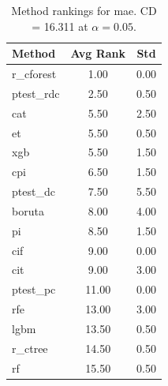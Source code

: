 \begin{table}[h]
\centering
\caption{Method rankings for mae. CD = 16.311 at $\alpha=0.05$.}
\label{tab:ranks_mae}
\begin{tabular}{lcc}
\toprule
Method & Avg Rank & Std \\
\midrule
r_cforest & 1.00 & 0.00 \\
ptest_rdc & 2.50 & 0.50 \\
cat & 5.50 & 2.50 \\
et & 5.50 & 0.50 \\
xgb & 5.50 & 1.50 \\
cpi & 6.50 & 1.50 \\
ptest_dc & 7.50 & 5.50 \\
boruta & 8.00 & 4.00 \\
pi & 8.50 & 1.50 \\
cif & 9.00 & 0.00 \\
cit & 9.00 & 3.00 \\
ptest_pc & 11.00 & 0.00 \\
rfe & 13.00 & 3.00 \\
lgbm & 13.50 & 0.50 \\
r_ctree & 14.50 & 0.50 \\
rf & 15.50 & 0.50 \\
\bottomrule
\end{tabular}
\end{table}